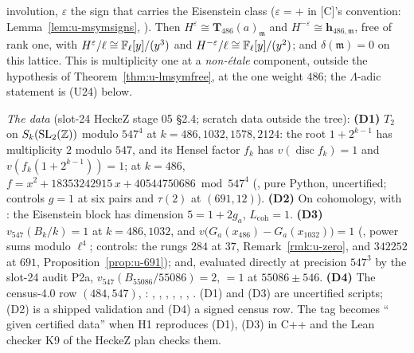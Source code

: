 \documentclass[11pt]{article}
\newcommand{\Iw}{\Lambda}                         %
\newcommand{\hcusp}{\mathbf{h}}                   %
\newcommand{\Tu}{\mathbf{T}}                      %
\begin{document}
\begin{proposition}
\begin{enumerate}
  involution, $\varepsilon$ the sign that carries the Eisenstein class ($\varepsilon=+$ in [C]'s convention: Lemma~\ref{lem:u-msymsigns}, ). Then $H^{\varepsilon}\cong\Tu_{486}(a)_{\mathfrak m}$ and $H^{-\varepsilon}\cong\hcusp_{486,\mathfrak m}$, free of
  rank one, with $H^{\varepsilon}/\ell\cong\mathbb{F}_\ell[y]/(y^{3})$ and $H^{-\varepsilon}/\ell\cong\mathbb{F}_\ell[y]/(y^{2})$; and $\delta(\mathfrak m)=0$ on this lattice. This is multiplicity one at a
  \emph{non-étale} component, outside the hypothesis of Theorem~\ref{thm:u-lmsymfree}, at the one weight $486$; the $\Iw$-adic statement is (U24) below.
\end{enumerate}
\emph{The data} (slot-24 HeckeZ stage 05 \S2.4; scratch data outside the tree):
\textbf{(D1)} $T_2$ on $S_k(\mathrm{SL}_2(\mathbb{Z}))$ modulo $547^{4}$ at $k=486,1032,1578,2124$: the root $1+2^{k-1}$ has multiplicity $2$ modulo $547$, and its Hensel factor $f_k$ has
$v(\operatorname{disc}f_k)=1$ and $v(f_k(1+2^{k-1}))=1$; at $k=486$, $f=x^{2}+18353242915\,x+40544750686\bmod547^{4}$ (, pure Python, uncertified; controls
$g=1$ at six pairs and $\tau(2)$ at $(691,12)$).
\textbf{(D2)} On cohomology,  with : the Eisenstein block has dimension $5=1+2g_a$, $L_{\mathrm{coh}}=1$.
\textbf{(D3)} $v_{547}(B_k/k)=1$ at $k=486,1032$, and $v\bigl(G_a(x_{486})-G_a(x_{1032})\bigr)=1$ (, power sums modulo $\ell^{4}$; controls: the rungs $284$ at $37$,
Remark~\ref{rmk:u-zero}, and $342252$ at $691$, Proposition~\ref{prop:u-691}); and, evaluated directly at precision $547^{3}$ by the slot-24 audit P2a,
$v_{547}(B_{55086}/55086)=2$, $=1$ at $55086\pm546$.
\textbf{(D4)} The census-4.0 row $(484,547)$, : , , , , ,
, .
(D1) and (D3) are uncertified scripts; (D2) is a shipped validation and (D4) a signed census row. The tag becomes ``\PROVED{} given certified data'' when H1 reproduces
(D1), (D3) in C++ and the Lean checker K9 of the HeckeZ plan checks them.
\end{proposition}
\end{document}
